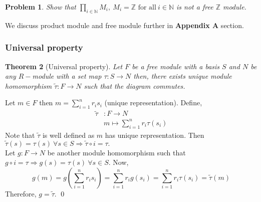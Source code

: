\documentclass[11pt]{amsart}
\newtheorem{theorem}{Theorem}[section]
\newtheorem{problem}[theorem]{Problem}
\newcommand{\ZZ}{\mathbb Z}
\newcommand{\NN}{\mathbb N}
\begin{document}
\begin{problem}
Show that $\displaystyle\prod_{i\in {\NN}} M_i,~M_i={\ZZ}\text{~for all}~ i\in {\NN}$ is not a free ${\ZZ}$ module.
\end{problem}

We discuss product module and free module further in \textbf{Appendix A} section.

\subsubsection{Universal property}
\begin{theorem}[Universal property]
Let $F$ be a free module with a basis $S$ and $N$ be any $R-$module with a set map $\tau:S\to N$ then, there exists unique module homomorphism $\tilde{\tau}:F\to N$ such that the diagram commutes.\begin{center}
\end{center}
\end{theorem}
\proof Let $m\in F$ then $m=\displaystyle\sum_{i=1}^n r_is_i$ (unique representation). Define, \begin{align*}
\tilde{\tau}&:F\to N\\
&m\mapsto \displaystyle\sum_{i=1}^n r_i\tau(s_i)
\end{align*}
Note that $\tilde{\tau}$ is well defined as $m$ has unique representation. Then $\tilde{\tau}(s)=\tau(s)~\forall s\in S \Rightarrow \tilde{\tau}\circ i=\tau.$\\
Let $g:F\to N$ be another module homomorphism such that $g\circ i=\tau \Rightarrow g(s)=\tau(s) ~\forall s\in S.$ Now, $$g(m)=g\left(\displaystyle\sum_{i=1}^n r_is_i\right)=\displaystyle\sum_{i=1}^n r_ig(s_i)=\displaystyle\sum_{i=1}^n r_i\tau(s_i)=\tilde{\tau}(m)$$ Therefore, $g=\tilde{\tau}.$ \qed
\end{document}
